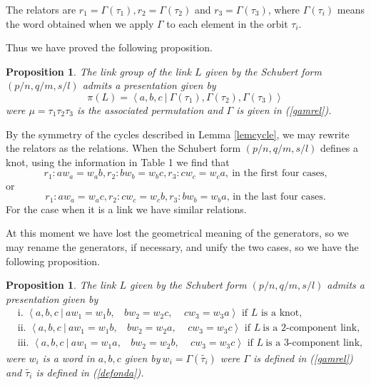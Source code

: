 \documentclass[12pt]{article}%
\newtheorem{proposition}[theorem]{Proposition}
\begin{document}
The relators are $r_{1}=\Gamma\left(  \tau_{1}\right)  ,r_{2}=\Gamma\left(
\mathcal{\tau}_{2}\right)  $ and $r_{3}=\Gamma\left(  \mathcal{\tau}%
_{3}\right)  $, where $\Gamma\left(  \tau_{i}\right)  $ means the word
obtained when we apply $\Gamma$ to each element in the orbit $\tau_{i}$.

Thus we have proved the following proposition.

\begin{proposition}
\label{presover}The link group of the link $L$ given by the Schubert form
$\left(  p/n,q/m,s/l\right)  $ admits a presentation given by
\[
\pi\left(  L\right)  =\left\langle a,b,c\ |\ \Gamma\left(  \tau_{1}\right)
,\Gamma\left(  \tau_{2}\right)  ,\Gamma\left(  \tau_{3}\right)  \right\rangle
\]
were $\mu=\tau_{1}\tau_{2}\tau_{3}$ is the associated permutation and $\Gamma$
is given in (\ref{gamrel}).
\end{proposition}

By the symmetry of the cycles described in Lemma \ref{lemcycle}, we may
rewrite the relators as the relations. When the Schubert form $\left(
p/n,q/m,s/l\right)  $ defines a knot, using the information in Table 1 we find
that
\[
r_{1}:aw_{a}=w_{a}b,r_{2}:bw_{b}=w_{b}c,r_{3}:cw_{c}=w_{c}a,\ \text{in the
first four cases,}%
\]
or%
\[
r_{1}:aw_{a}=w_{a}c,r_{2}:cw_{c}=w_{c}b,r_{3}:bw_{b}=w_{b}a\text{, in the last
four cases.}%
\]
For the case when it is a link we have similar relations.

At this moment we have lost the geometrical meaning of the generators, so we
may rename the generators, if necessary, and unify the two cases, so we have
the following proposition.

\begin{proposition}
\label{presoverpal}The link $L$ given by the Schubert form $\left(
p/n,q/m,s/l\right)  $ admits a presentation given by
\begin{align*}
&  \text{i. }\left\langle a,b,c\ |\ aw_{1}=w_{1}b,\ \ \ \ bw_{2}%
=w_{2}c,\ \ \ \ \ cw_{3}=w_{3}a\right\rangle \text{ if }L\text{ is a knot,}\\
&  \text{ii. }\left\langle a,b,c\ |\ aw_{1}=w_{1}b,\ \ \ \ bw_{2}%
=w_{2}a,\ \ \ \ \ cw_{3}=w_{3}c\right\rangle \text{ if }L\ \text{is a
2-component link,}\\
&  \text{iii. }\left\langle a,b,c\ |\ aw_{1}=w_{1}a,\ \ \ \ bw_{2}%
=w_{2}b,\ \ \ \ \ cw_{3}=w_{3}c\right\rangle \text{ if }L\ \text{is a
3-component link,}%
\end{align*}
were $w_{i}$ is a word in $a,b,c$ given by$\ w_{i}=\Gamma\left(
\widetilde{\tau_{i}}\right)  $ were $\Gamma$ is defined in (\ref{gamrel}) and
$\widetilde{\tau_{i}}$ is defined in (\ref{defonda}).
\end{proposition}
\end{document}
